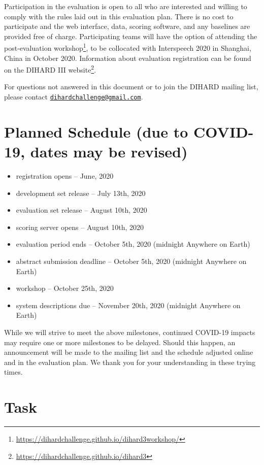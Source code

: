 \documentclass{article}
\newcommand{\email}[1]{\href{mailto:#1}{\nolinkurl{#1}}}
\begin{document}
Participation in the evaluation is open to all who are interested and willing to comply with the rules laid out in this evaluation plan. There is no cost to participate and the web interface, data, scoring software, and any baselines are provided free of charge. Participating teams will have the option of attending the post-evaluation workshop\footnote{\url{https://dihardchallenge.github.io/dihard3workshop/}}, to be collocated with Interspeech 2020 in Shanghai, China in October 2020. Information about evaluation registration can be found on the DIHARD III website\footnote{\url{https://dihardchallenge.github.io/dihard3}}.

For questions not answered in this document or to join the DIHARD mailing list, please contact \email{dihardchallenge@gmail.com}. 
    
    
    
    
    
    
    
\section{Planned Schedule (due to COVID-19, dates may be revised)}
\label{sec:schedule}
	\begin{itemize}
        \item registration opens  -- June, 2020
    	\item development set release  --  July 13th, 2020
    	\item evaluation set release  --  August 10th, 2020
    	\item scoring server opens  --  August 10th, 2020
    	\item evaluation period ends  --  October 5th, 2020 (midnight Anywhere on Earth)
    	\item abstract submission deadline  --  October 5th, 2020 (midnight Anywhere on Earth)
    	\item workshop  --  October 25th, 2020
    	\item system descriptions due  --  November 20th, 2020 (midnight Anywhere on Earth)
    \end{itemize}
While we will strive to meet the above milestones, continued COVID-19 impacts may require one or more milestones to be delayed. Should this happen, an announcement will be made to the mailing list and the schedule adjusted online and in the evaluation plan. We thank you for your understanding in these trying times.
    

\section{Task}
\end{document}

